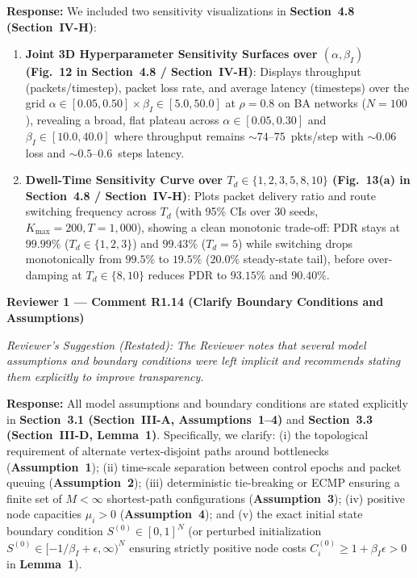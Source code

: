 \documentclass[11pt,a4paper]{article}
\newcommand{\cbox}[2]{%
  \vspace{0.6em}\noindent\textbf{#1}\par\smallskip
  \noindent\textit{Reviewer's Suggestion (Restated):} \textit{#2}\par\smallskip
}
\begin{document}
\noindent\textbf{Response:} We included two sensitivity visualizations in \textbf{Section~4.8 (Section~IV-H)}:
\begin{enumerate}[leftmargin=1.8em]
    \item \textbf{Joint 3D Hyperparameter Sensitivity Surfaces over $(\alpha, \beta_I)$ (\textbf{Fig.~12} in Section~4.8 / Section~IV-H)}: Displays throughput (packets/timestep), packet loss rate, and average latency (timesteps) over the grid $\alpha \in [0.05, 0.50] \times \beta_I \in [5.0, 50.0]$ at $\rho=0.8$ on BA networks ($N=100$), revealing a broad, flat plateau across $\alpha \in [0.05, 0.30]$ and $\beta_I \in [10.0, 40.0]$ where throughput remains $\sim 74$--$75$~pkts/step with $\sim 0.06$ loss and $\sim 0.5$--$0.6$~steps latency.
    \item \textbf{Dwell-Time Sensitivity Curve over $T_d \in \{1, 2, 3, 5, 8, 10\}$ (\textbf{Fig.~13(a)} in Section~4.8 / Section~IV-H)}: Plots packet delivery ratio and route switching frequency across $T_d$ (with 95\% CIs over 30 seeds, $K_{\max}=200, T=1{,}000$), showing a clean monotonic trade-off: PDR stays at $99.99\%$ ($T_d \in \{1,2,3\}$) and $99.43\%$ ($T_d=5$) while switching drops monotonically from $99.5\%$ to $19.5\%$ ($20.0\%$ steady-state tail), before over-damping at $T_d \in \{8, 10\}$ reduces PDR to $93.15\%$ and $90.40\%$.
\end{enumerate}

\hrulefill

\cbox{Reviewer 1 --- Comment R1.14 (Clarify Boundary Conditions and Assumptions)}{The Reviewer notes that several model assumptions and boundary conditions were left implicit and recommends stating them explicitly to improve transparency.}

\noindent\textbf{Response:} All model assumptions and boundary conditions are stated explicitly in \textbf{Section~3.1 (Section~III-A, Assumptions~1--4)} and \textbf{Section~3.3 (Section~III-D, Lemma~1)}. Specifically, we clarify: (i) the topological requirement of alternate vertex-disjoint paths around bottlenecks (\textbf{Assumption~1}); (ii) time-scale separation between control epochs and packet queuing (\textbf{Assumption~2}); (iii) deterministic tie-breaking or ECMP ensuring a finite set of $M < \infty$ shortest-path configurations (\textbf{Assumption~3}); (iv) positive node capacities $\mu_i > 0$ (\textbf{Assumption~4}); and (v) the exact initial state boundary condition $S^{(0)} \in [0,1]^N$ (or perturbed initialization $S^{(0)} \in [-1/\beta_I+\epsilon, \infty)^N$ ensuring strictly positive node costs $C_i^{(0)} \ge 1+\beta_I\epsilon > 0$ in \textbf{Lemma~1}).
\end{document}
